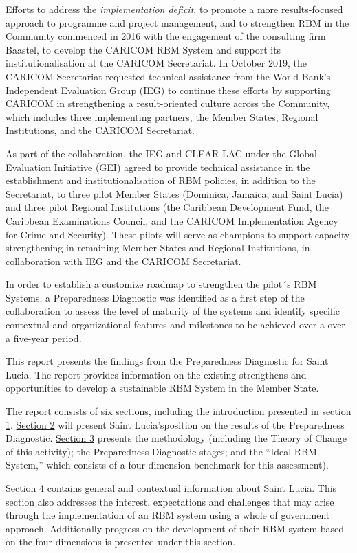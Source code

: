 \documentclass[
  10pt,
]{book}
\begin{document}
Efforts to address the \emph{implementation deficit}, to promote a more results-focused approach to programme and project management, and to strengthen RBM in the Community commenced in 2016 with the engagement of the consulting firm Baastel, to develop the CARICOM RBM System and support its institutionalisation at the CARICOM Secretariat. In October 2019, the CARICOM Secretariat requested technical assistance from the World Bank's Independent Evaluation Group (IEG) to continue these efforts by supporting CARICOM in strengthening a result-oriented culture across the Community, which includes three implementing partners, the Member States, Regional Institutions, and the CARICOM Secretariat.

As part of the collaboration, the IEG and CLEAR LAC under the Global Evaluation Initiative (GEI) agreed to provide technical assistance in the establishment and institutionalisation of RBM policies, in addition to the Secretariat, to three pilot Member States (Dominica, Jamaica, and Saint Lucia) and three pilot Regional Institutions (the Caribbean Development Fund, the Caribbean Examinations Council, and the CARICOM Implementation Agency for Crime and Security). These pilots will serve as champions to support capacity strengthening in remaining Member States and Regional Institutions, in collaboration with IEG and the CARICOM Secretariat.

In order to establish a customize roadmap to strengthen the pilot´s RBM Systems, a Preparedness Diagnostic was identified as a first step of the collaboration to assess the level of maturity of the systems and identify specific contextual and organizational features and milestones to be achieved over a over a five-year period.

This report presents the findings from the Preparedness Diagnostic for Saint Lucia. The report provides information on the existing strengthens and opportunities to develop a sustainable RBM System in the Member State.

The report consists of six sections, including the introduction presented in \protect\hyperlink{section1}{section 1}. \protect\hyperlink{section2}{Section 2} will present Saint Lucia'sposition on the results of the Preparedness Diagnostic. \protect\hyperlink{section3}{Section 3} presents the methodology (including the Theory of Change of this activity); the Preparedness Diagnostic stages; and the ``Ideal RBM System,'' which consists of a four-dimension benchmark for this assessment).

\protect\hyperlink{section4}{Section 4} contains general and contextual information about Saint Lucia. This section also addresses the interest, expectations and challenges that may arise through the implementation of an RBM system using a whole of government approach. Additionally progress on the development of their RBM system based on the four dimensions is presented under this section.
\end{document}
